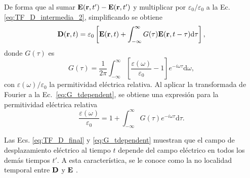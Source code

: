 %
De forma que al sumar $\vb{E}(\vb{r},t')-\vb{E}(\vb{r},t')$ y multiplicar por $\varepsilon_0/\varepsilon_0$ a la Ec. \eqref{eq:TF_D_intermedia_2}, simplificando se obtiene
%
\begin{equation}
	\vb{D}(\vb{r},t)=\varepsilon_0\left[\vb{E}(\vb{r},t)+\int_{-\infty}^{\infty}G(\tau)\vb{E}(\vb{r},t-\tau)\text{d}\tau\right],\label{eq:TF_D_final} 
\end{equation}
%
\noindent donde $G(\tau)$ es \cite{jacksonClassicalElectrodynamics2021a}
%
\begin{equation}
	G(\tau)=\frac{1}{2\pi}\int_{-\infty}^{\infty}\left[\frac{\varepsilon(\omega)}{\varepsilon_0}-1\right]e^{-i\omega\tau}\text{d}\omega,
	\label{eq:G_tdependent} 
\end{equation}
%
\noindent con $\varepsilon(\omega)/\varepsilon_0$ la permitividad eléctrica relativa. Al aplicar la transformada de Fourier a la Ec.~\eqref{eq:G_tdependent}, se obtiene una expresión para la permitividad eléctrica relativa
%
\begin{equation}
	\frac{\varepsilon(\omega)}{\varepsilon_0}=1+\int_{-\infty}^{\infty}G(\tau) e^{-i\omega\tau}\text{d}\tau.
	\label{eq:epsrelativa} 
\end{equation}
%

\noindent Las Ecs. \eqref{eq:TF_D_final} y \eqref{eq:G_tdependent} muestran que el campo de desplazamiento eléctrico al tiempo $t$ depende del campo eléctrico en todos los demás tiempos $t'$. A esta característica, se le conoce como la no localidad temporal entre $\vb{D}$ y $\vb{E}$ \cite{jacksonClassicalElectrodynamics2021a}. 

